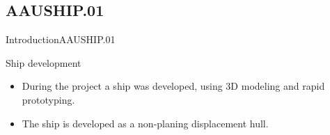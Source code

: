 
	\subsection{AAUSHIP.01}
	\begin{frame}{Introduction}{AAUSHIP.01}
	  \begin{block}{Ship development}
	  \begin{itemize}
	  	\item During the project a ship was developed, using 3D modeling and rapid prototyping.
	  	\item The ship is developed as a non-planing displacement hull.
	  	\end{itemize}
	  \end{block}
	  \begin{figure}
				\begin{center}
					\label{fig:aauship}
				\end{center}
			\end{figure}
	\end{frame}
